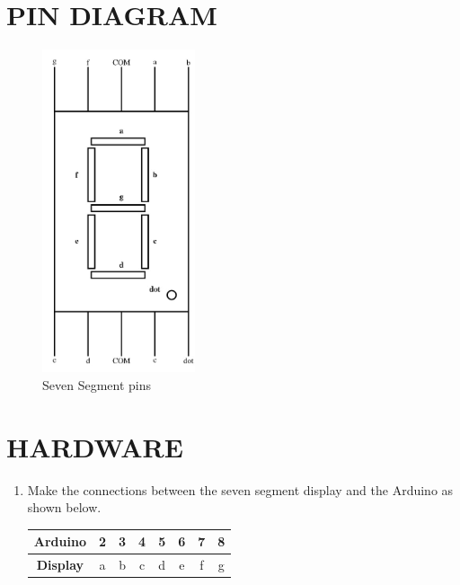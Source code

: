 \documentclass[journal,12pt,twocolumn]{IEEEtran}
\begin{document}
\section{PIN DIAGRAM}
\begin{figure}[H]
\centering
\includegraphics[width=0.4\textwidth]{pin.jpg}
\caption{Seven Segment pins}
\label{fig:div5 circuit.jpg}
\end{figure}



\section{HARDWARE}
\begin{enumerate}
\item Make the connections between the seven segment display and the Arduino as shown below.\\
	\begin{table}[h!]
    \centering
    \small  %
    \begin{tabular}{|c|c|c|c|c|c|c|c|}
        \hline
        \textbf{Arduino}  & 2 & 3 & 4 & 5 & 6 & 7 & 8\\
        \hline
        \textbf{Display} &a&b&c&d&e&f&g\\
        \hline
    \end{tabular}
\end{table} 


\end{enumerate}
\end{document}
